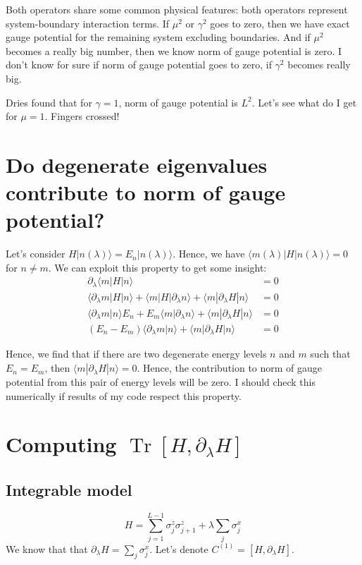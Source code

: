 \documentclass[11pt,a4paper]{article}
\DeclareMathOperator{\Tr}{Tr}
\begin{document}
Both operators share some common physical features: both operators represent system-boundary interaction terms. If $\mu^2$ or $\gamma^2$ goes to zero, then we have exact gauge potential for the remaining system excluding boundaries. And if $\mu^2$ becomes a really big number, then we know norm of gauge potential is zero. I don't know for sure if  norm of gauge potential goes to zero, if $\gamma^2$ becomes really big.

Dries found that for $\gamma=1$, norm of gauge potential is $L^2$. Let's see what do I get for $\mu=1$. Fingers crossed! 
\appendix
\section{Do degenerate eigenvalues contribute to norm of gauge potential?}\label{sec.deg}
Let's consider $H | n(\lambda) \rangle= E_n  | n(\lambda) \rangle $. Hence, we have $\langle m(\lambda)  |  H | n(\lambda) \rangle=0$ for $n\neq m$. We can exploit this property to get some insight:
\begin{align*}
\partial_{\lambda}\langle m  |  H | n\rangle&=0\\
\langle \partial_{\lambda} m |  H | n \rangle + \langle  m  |  H |\partial_{\lambda} n \rangle + \langle  m  | \partial_{\lambda} H | n \rangle&=0\\
\langle \partial_{\lambda} m   | n \rangle E_n + E_m\langle  m  |   \partial_{\lambda} n \rangle + \langle  m  | \partial_{\lambda} H | n \rangle&=0\\
(E_n - E_m)\langle  \partial_{\lambda} m  |    n \rangle + \langle  m  | \partial_{\lambda} H | n \rangle&=0
\end{align*}

Hence, we find that if there are two degenerate energy levels $n$ and $m$ such that $E_n=E_m$, then $\langle  m  | \partial_{\lambda} H | n \rangle=0$. Hence, the contribution to norm of gauge potential from this pair of energy levels will be zero. I should check this numerically if results of my code respect this property.


\section{Computing $\Tr [H, \partial_{\lambda}H] $}
\subsection{Integrable model}
\begin{equation}
H=  \sum_{j=1}^{L-1} \sigma_j^z \sigma_{j+1}^z + \lambda \sum_{j} \sigma_j^x
\end{equation}
We know that that $\partial_{\lambda}H =  \sum_{j} \sigma_j^x $. Let's denote  $C^{(1)}=[H,\partial_{\lambda}H]$. 
\end{document}
